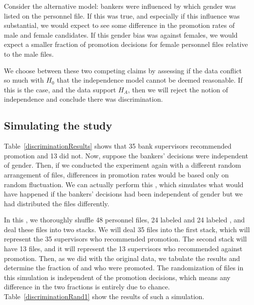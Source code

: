 Consider the alternative model: bankers were influenced by which gender was listed on the personnel file. If this was true, and especially if this influence was substantial, we would expect to see some difference in the promotion rates of male and female candidates. If this gender bias was against females, we would expect a smaller fraction of promotion decisions for female personnel files relative to the male files.

We choose between these two competing claims by assessing if the data conflict so much with $H_0$ that the independence model cannot be deemed reasonable. If this is the case, and the data support $H_A$, then we will reject the notion of independence and conclude there was discrimination.

\subsection{Simulating the study}
\label{simulatingTheStudy}

Table~\ref{discriminationResults} shows that 35 bank supervisors recommended promotion and 13 did not. Now, suppose the bankers' decisions were independent of gender. Then, if we conducted the experiment again with a different random arrangement of files, differences in promotion rates would be based only on random fluctuation. We can actually perform this , which simulates what would have happened if the bankers' decisions had been independent of gender but we had distributed the files differently.

In this , we thoroughly shuffle 48 personnel files, 24 labeled  and 24 labeled , and deal these files into two stacks. We will deal 35 files into the first stack, which will represent the 35 supervisors who recommended promotion. The second stack will have 13 files, and it will represent the 13 supervisors who recommended against promotion. Then, as we did with the original data, we tabulate the results and determine the fraction of  and  who were promoted. The randomization of files in this simulation is independent of the promotion decisions, which means any difference in the two fractions is entirely due to chance. Table~\ref{discriminationRand1} show the results of such a simulation.

